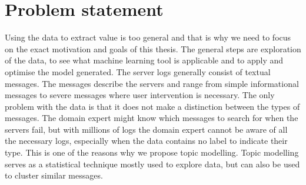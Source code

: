 \begin{comment}
--todo--
The intention of this research started with analysing e system logs to help create a model for predicting hardware and software failure for maintenance and automatic self-healing. The huge amount of system logs available from a variety of systems brought the question how to analyse and make use of the logs to predict hardware and software failure.

Current research of big data makes this a suitable problem to solve through recent machine learning techniques. 
During the time spent on this research challenges were met and identified for realising this goal and ended with the usage of Natural Language Processing (NLP) and unsupervised learning.  The untapped amount of raw data makes it possible for many more application, but in further paragraphs it will be made clear why NLP was chosen and what more could be applied on this Big data problem.

\end{comment}
 
\section{Problem statement}\label{introduction:Motivation}
Using the data to extract value is too general and that is why we need to focus on the exact motivation and goals of this thesis. The general steps are exploration of the data, to see what machine learning tool is applicable and to apply and optimise the model generated. The server logs generally consist of textual messages. The messages describe the servers and range from simple informational messages to severe messages where user intervention is necessary. The only problem with the data is that it does not make a distinction between the types of messages. The domain expert might know which messages to search for when the servers fail, but with millions of logs the domain expert cannot be aware of all the necessary logs, especially when the data contains no label to indicate their type. This is one of the reasons why we propose topic modelling. Topic modelling serves as a statistical technique mostly used to explore data, but can also be used to cluster similar messages.


\begin{comment}

Topic modelling is a hot topic in data science. System logs are used as source for the detection of problems in large computer systems. While domain experts can be used to detect and fix the problems detected, this can be difficult and time consuming. Machine learning techniques like topic modelling make it possible to develop models to extract these latent patterns from these system logs. While topic modelling is normally used in for large text corpera, recent research in the field of short text clustering and twitter tweets clustering are similar enough to by applicable for system logs. An interesting application which has not yet been touched a lot through unsupervised machine learning techniques.

\end{comment}

